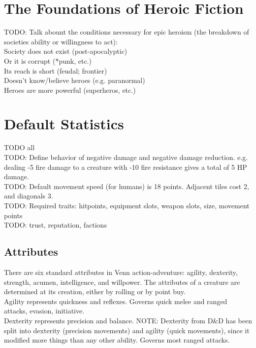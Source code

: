 \documentclass[letterpaper,titlepage,openany,twocolumn]{book}
\begin{document}
\chapter{The Foundations of Heroic Fiction}
TODO: Talk abount the conditions necessary for epic heroism (the breakdown of societies ability or willingness to act):\\
	Society does not exist (post-apocalyptic)\\
	Or it is corrupt (*punk, etc.)\\
	Its reach is short (feudal; frontier)\\
	Doesn’t know/believe heroes (e.g. paranormal)\\
	Heroes are more powerful (superheros, etc.)\\

\chapter{Default Statistics}
TODO all\\
TODO: Define behavior of negative damage and negative damage reduction. e.g. dealing -5 fire damage to a creature with -10 fire resistance gives a total of 5 HP damage.\\
TODO: Default movement speed (for humans) is 18 points. Adjacent tiles cost 2, and diagonals 3.\\
TODO: Required traits: hitpoints, equipment slots, weapon slots, size, movement points\\
TODO: trust, reputation, factions\\

\section{Attributes}
There are six standard attributes in Venn action-adventure: agility, dexterity, strength, acumen, intelligence, and willpower. The attributes of a creature are determined at its creation, either by rolling or by point buy.\\

Agility represents quickness and reflexes. Governs quick melee and ranged attacks, evasion, initiative.\\

Dexterity represents precision and balance. NOTE: Dexterity from D\&D has been split into dexterity (precision movements) and agility (quick movements), since it modified more things than any other ability. Governs most ranged attacks.\\
\end{document}
